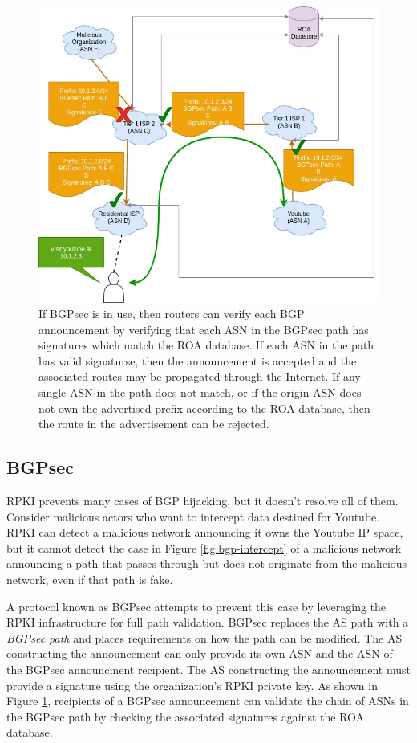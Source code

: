 \documentclass[conference]{IEEEtran}
\begin{document}
\begin{figure}[hp]
  \includegraphics[width=\linewidth]{images/bgpsec-ops.jpg}
  \caption{If BGPsec is in use, then routers can verify each BGP announcement by verifying that each ASN in the BGPsec path has signatures which match the ROA database.  If each ASN in the path has valid signaturse, then the announcement is accepted and the associated routes may be propagated through the Internet.  If any single ASN in the path does not match, or if the origin ASN does not own the advertised prefix according to the ROA database, then the route in the advertisement can be rejected.}
  \label{fig:bgpsec-ops}
\end{figure}

\subsection{BGPsec}
RPKI prevents many cases of BGP hijacking, but it doesn't resolve all of them.  Consider malicious actors who want to intercept data destined for Youtube.  RPKI can detect a malicious network announcing it owns the Youtube IP space, but it cannot detect the case in Figure \ref{fig:bgp-intercept} of a malicious network announcing a path that passes through but does not originate from the malicious network, even if that path is fake.

A protocol known as BGPsec attempts to prevent this case by leveraging the RPKI infrastructure for full path validation.  BGPsec replaces the AS path with a \emph{BGPsec path} and places requirements on how the path can be modified.  The AS constructing the announcement can only provide its own ASN and the ASN of the BGPsec announcment recipient.  The AS constructing the announcement must provide a signature using the organization's RPKI private key.  As shown in Figure \ref{fig:bgpsec-ops}, recipients of a BGPsec announcement can validate the chain of ASNs in the BGPsec path by checking the associated signatures against the ROA database.
\end{document}

